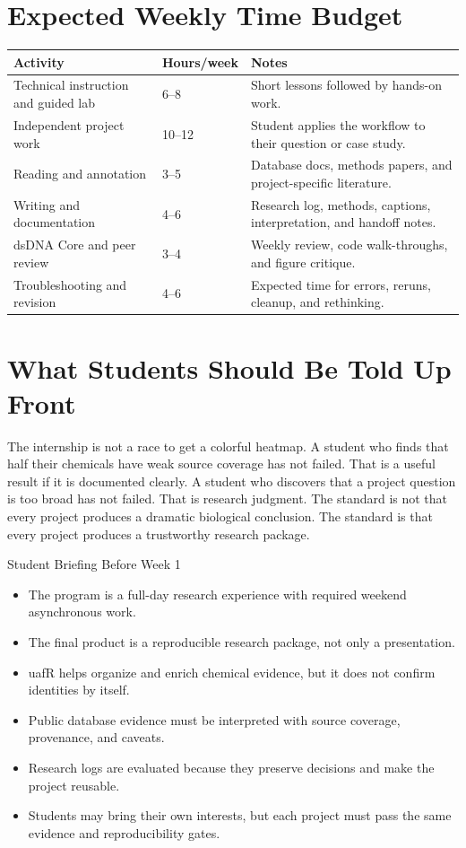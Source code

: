 \section{Expected Weekly Time Budget}
\begin{tabularx}{\textwidth}{p{}p{}Y}
\toprule
\textbf{Activity} & \textbf{Hours/week} & \textbf{Notes}\\
\midrule
Technical instruction and guided lab & 6--8 & Short lessons followed by hands-on work.\\
Independent project work & 10--12 & Student applies the workflow to their question or case study.\\
Reading and annotation & 3--5 & Database docs, methods papers, and project-specific literature.\\
Writing and documentation & 4--6 & Research log, methods, captions, interpretation, and handoff notes.\\
dsDNA Core and peer review & 3--4 & Weekly review, code walk-throughs, and figure critique.\\
Troubleshooting and revision & 4--6 & Expected time for errors, reruns, cleanup, and rethinking.\\
\bottomrule
\end{tabularx}

\section{What Students Should Be Told Up Front}
The internship is not a race to get a colorful heatmap. A student who finds that half their chemicals have weak source coverage has not failed. That is a useful result if it is documented clearly. A student who discovers that a project question is too broad has not failed. That is research judgment. The standard is not that every project produces a dramatic biological conclusion. The standard is that every project produces a trustworthy research package.

\begin{checklistbox}{Student Briefing Before Week 1}
\begin{itemize}
  \item The program is a full-day research experience with required weekend asynchronous work.
  \item The final product is a reproducible research package, not only a presentation.
  \item uafR helps organize and enrich chemical evidence, but it does not confirm identities by itself.
  \item Public database evidence must be interpreted with source coverage, provenance, and caveats.
  \item Research logs are evaluated because they preserve decisions and make the project reusable.
  \item Students may bring their own interests, but each project must pass the same evidence and reproducibility gates.
\end{itemize}
\end{checklistbox}

